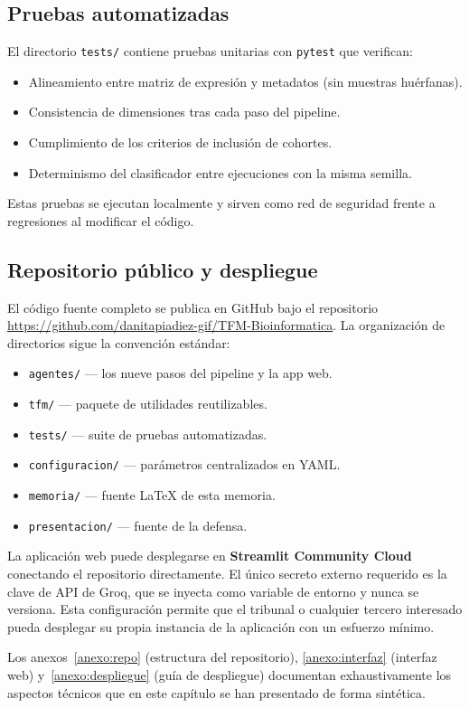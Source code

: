 \subsection{Pruebas automatizadas}

El directorio \texttt{tests/} contiene pruebas unitarias con
\texttt{pytest} que verifican:

\begin{itemize}[leftmargin=1.2em]
  \item Alineamiento entre matriz de expresión y metadatos (sin
  muestras huérfanas).
  \item Consistencia de dimensiones tras cada paso del pipeline.
  \item Cumplimiento de los criterios de inclusión de cohortes.
  \item Determinismo del clasificador entre ejecuciones con la misma
  semilla.
\end{itemize}

Estas pruebas se ejecutan localmente y sirven como red de seguridad
frente a regresiones al modificar el código.

\subsection{Repositorio público y despliegue}

El código fuente completo se publica en GitHub bajo el repositorio
\url{https://github.com/danitapiadiez-gif/TFM-Bioinformatica}. La
organización de directorios sigue la convención estándar:

\begin{itemize}[leftmargin=1.2em]
  \item \texttt{agentes/} --- los nueve pasos del pipeline y la app web.
  \item \texttt{tfm/} --- paquete de utilidades reutilizables.
  \item \texttt{tests/} --- suite de pruebas automatizadas.
  \item \texttt{configuracion/} --- parámetros centralizados en YAML.
  \item \texttt{memoria/} --- fuente LaTeX de esta memoria.
  \item \texttt{presentacion/} --- fuente de la defensa.
\end{itemize}

La aplicación web puede desplegarse en \textbf{Streamlit Community
Cloud} conectando el repositorio directamente. El único secreto externo
requerido es la clave de API de Groq, que se inyecta como variable de
entorno y nunca se versiona. Esta configuración permite que el tribunal
o cualquier tercero interesado pueda desplegar su propia instancia de
la aplicación con un esfuerzo mínimo.

Los anexos~\ref{anexo:repo} (estructura del repositorio),
\ref{anexo:interfaz} (interfaz web) y~\ref{anexo:despliegue} (guía de
despliegue) documentan exhaustivamente los aspectos técnicos que en
este capítulo se han presentado de forma sintética.
